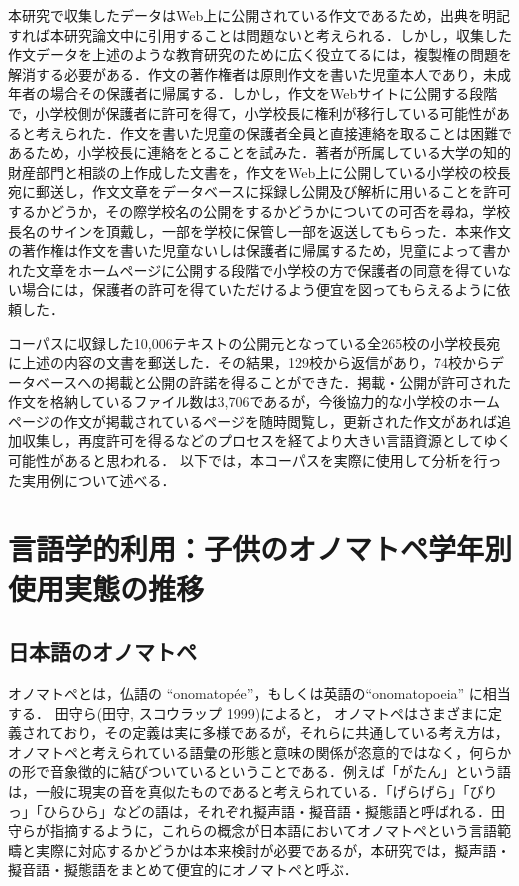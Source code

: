 \documentclass[japanese]{jnlp_1.4}
\begin{document}
本研究で収集したデータはWeb上に公開されている作文であるため，出典を明記すれば本研究論文中に引用することは問題ないと考えられる．しかし，収集した作文データを上述のような教育研究のために広く役立てるには，複製権の問題を解消する必要がある．作文の著作権者は原則作文を書いた児童本人であり，未成年者の場合その保護者に帰属する．しかし，作文をWebサイトに公開する段階で，小学校側が保護者に許可を得て，小学校長に権利が移行している可能性があると考えられた．作文を書いた児童の保護者全員と直接連絡を取ることは困難であるため，小学校長に連絡をとることを試みた．著者が所属している大学の知的財産部門と相談の上作成した文書を，作文をWeb上に公開している小学校の校長宛に郵送し，作文文章をデータベースに採録し公開及び解析に用いることを許可するかどうか，その際学校名の公開をするかどうかについての可否を尋ね，学校長名のサインを頂戴し，一部を学校に保管し一部を返送してもらった．本来作文の著作権は作文を書いた児童ないしは保護者に帰属するため，児童によって書かれた文章をホームページに公開する段階で小学校の方で保護者の同意を得ていない場合には，保護者の許可を得ていただけるよう便宜を図ってもらえるように依頼した．

コーパスに収録した10,006テキストの公開元となっている全265校の小学校長宛に上述の内容の文書を郵送した．その結果，129校から返信があり，74校からデータベースへの掲載と公開の許諾を得ることができた．掲載・公開が許可された作文を格納しているファイル数は3,706であるが，今後協力的な小学校のホームページの作文が掲載されているページを随時閲覧し，更新された作文があれば追加収集し，再度許可を得るなどのプロセスを経てより大きい言語資源としてゆく可能性があると思われる．
以下では，本コーパスを実際に使用して分析を行った実用例について述べる．



\section{言語学的利用：子供のオノマトペ学年別使用実態の推移}

\subsection{日本語のオノマトペ}

オノマトペとは，仏語の ``onomatop\'{e}e''，もしくは英語の``onomatopoeia'' に相当する．
    田守ら(田守, スコウラップ 1999)\nocite{Bk_TamAl}によると，
オノマトペはさまざまに定義されており，その定義は実に多様であるが，それらに共通している考え方は，オノマトペと考えられている語彙の形態と意味の関係が恣意的ではなく，何らかの形で音象徴的に結びついているということである．例えば「がたん」という語は，一般に現実の音を真似たものであると考えられている．「げらげら」「びりっ」「ひらひら」などの語は，それぞれ擬声語・擬音語・擬態語と呼ばれる．田守らが指摘するように，これらの概念が日本語においてオノマトペという言語範疇と実際に対応するかどうかは本来検討が必要であるが，本研究では，擬声語・擬音語・擬態語をまとめて便宜的にオノマトペと呼ぶ．
\end{document}
